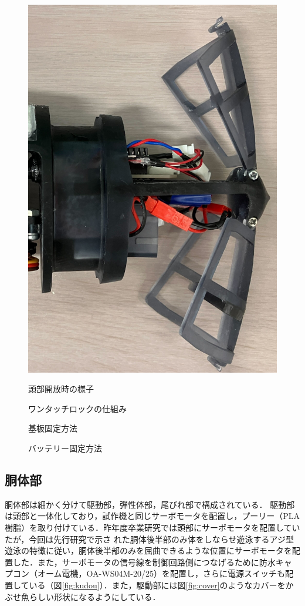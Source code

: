 \begin{figure}[t]
    \centering
    \begin{minipage}[b]{0.3\linewidth}
        \centering
        \includegraphics[width=0.6\linewidth]{chapters/picture/open_head.jpg}
        \caption{頭部開放時の様子}
        \label{fig:head_open}
    \end{minipage}
    \begin{minipage}[b]{0.5\linewidth}
        \centering
        \caption{ワンタッチロックの仕組み}
        \label{fig:rock}
    \end{minipage}
\end{figure}
\begin{figure}[t]
    \centering
    \begin{minipage}[b]{0.4\linewidth}
        \centering
        \caption{基板固定方法}
        \label{fig:toubu_kiban}
    \end{minipage}
    \hspace{0.1\linewidth}
    \begin{minipage}[b]{0.4\linewidth}
        \centering
        \caption{バッテリー固定方法}
        \label{fig:toubu_battery}
    \end{minipage}
\end{figure}

\subsection{胴体部}
胴体部は細かく分けて駆動部，弾性体部，尾びれ部で構成されている．
駆動部は頭部と一体化しており，試作機と同じサーボモータを配置し，プーリー（PLA樹脂）を取り付けている．昨年度卒業研究では頭部にサーボモータを配置していたが，今回は先行研究\cite{juu}で示さ
れた胴体後半部のみ体をしならせ遊泳するアジ型遊泳の特徴に従い，胴体後半部のみを屈曲できるような位置にサーボモータを配置した．また，サーボモータの信号線を制御回路側につなげるために防水キャ
プコン（オーム電機，OA-WS04M-20/25）を配置し，さらに電源スイッチも配置している（図\ref{fig:kudou}）．また，駆動部には図\ref{fig:cover}のようなカバーをかぶせ魚らしい形状になるようにしている．


